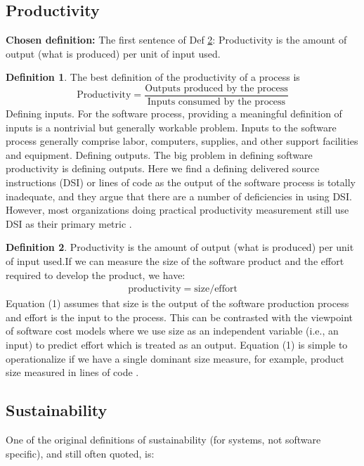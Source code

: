 \documentclass[letterpaper,cleveref]{lipics-v2019}
\theoremstyle{definition}
\newtheorem{defn}{Definition}
\begin{document}
\subsection{Productivity}
\noindent \textbf{Chosen definition:} The first sentence of Def
\ref{ProductivitySelected}: Productivity is the amount of output (what is
produced) per unit of input used.
\begin{defn}
The best definition of the productivity of a process is
\[\text{Productivity} = \dfrac{\text{Outputs produced by the
process}}{\text{Inputs consumed by the process}}\]
Defining inputs. For the software process, providing a meaningful definition of
inputs is a nontrivial but generally workable problem. Inputs to the software
process generally comprise labor, computers, supplies, and other support
facilities and equipment. Defining outputs. The big problem in defining software
productivity is defining outputs. Here we find a defining delivered source
instructions (DSI) or lines of code as the output of the software process is
totally inadequate, and they argue that there are a number of deficiencies in
using DSI. However, most organizations doing practical productivity measurement
still use DSI as their primary metric \citep{Boehm1987}.
\end{defn}
\begin{defn}
\label{ProductivitySelected}
Productivity is the amount of output (what is produced) per unit of input
used.If we can measure the size of the software product and the effort required
to develop the product, we have:
\begin{align}
\text{productivity} = \text{size}/\text{effort}
\end{align}
Equation (1) assumes that size is the output of the software production process
and effort is the input to the process. This can be contrasted with the
viewpoint of software cost models where we use size as an independent variable
(i.e., an input) to predict effort which is treated as an output. Equation (1)
is simple to operationalize if we have a single dominant size measure, for
example, product size measured in lines of code \citep{Kitchenham2004}.
\end{defn}

\subsection{Sustainability}

One of the original definitions of sustainability (for systems, not software
specific), and still often quoted, is:
\end{document}
